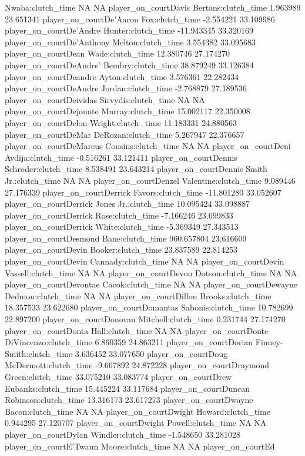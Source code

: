 \documentclass[
  landscape]{article}
\begin{document}
Nwaba:clutch\_time NA NA player\_on\_courtDavis Bertans:clutch\_time
1.963989 23.651341 player\_on\_courtDe'Aaron Fox:clutch\_time -2.554221
33.109986 player\_on\_courtDe'Andre Hunter:clutch\_time -11.943345
33.320169 player\_on\_courtDe'Anthony Melton:clutch\_time 3.554382
33.095683 player\_on\_courtDean Wade:clutch\_time 12.380746 27.174270
player\_on\_courtDeAndre' Bembry:clutch\_time 38.879249 33.126384
player\_on\_courtDeandre Ayton:clutch\_time 3.576361 22.282434
player\_on\_courtDeAndre Jordan:clutch\_time -2.768879 27.189536
player\_on\_courtDeividas Sirvydis:clutch\_time NA NA
player\_on\_courtDejounte Murray:clutch\_time 15.002117 22.350008
player\_on\_courtDelon Wright:clutch\_time 11.183331 24.880563
player\_on\_courtDeMar DeRozan:clutch\_time 5.267947 22.376657
player\_on\_courtDeMarcus Cousins:clutch\_time NA NA
player\_on\_courtDeni Avdija:clutch\_time -0.516261 33.121411
player\_on\_courtDennis Schroder:clutch\_time 8.538491 23.643214
player\_on\_courtDennis Smith Jr.:clutch\_time NA NA
player\_on\_courtDenzel Valentine:clutch\_time 9.089446 27.176339
player\_on\_courtDerrick Favors:clutch\_time -11.801280 33.052607
player\_on\_courtDerrick Jones Jr.:clutch\_time 10.095424 33.098887
player\_on\_courtDerrick Rose:clutch\_time -7.166246 23.699833
player\_on\_courtDerrick White:clutch\_time -5.369349 27.343513
player\_on\_courtDesmond Bane:clutch\_time 960.657804 23.616609
player\_on\_courtDevin Booker:clutch\_time 23.837589 22.814253
player\_on\_courtDevin Cannady:clutch\_time NA NA player\_on\_courtDevin
Vassell:clutch\_time NA NA player\_on\_courtDevon Dotson:clutch\_time NA
NA player\_on\_courtDevontae Cacok:clutch\_time NA NA
player\_on\_courtDewayne Dedmon:clutch\_time NA NA
player\_on\_courtDillon Brooks:clutch\_time 18.357533 23.622680
player\_on\_courtDomantas Sabonis:clutch\_time 10.782699 22.897200
player\_on\_courtDonovan Mitchell:clutch\_time 0.231744 27.174270
player\_on\_courtDonta Hall:clutch\_time NA NA player\_on\_courtDonte
DiVincenzo:clutch\_time 6.860359 24.863211 player\_on\_courtDorian
Finney-Smith:clutch\_time 3.636452 33.077650 player\_on\_courtDoug
McDermott:clutch\_time -9.667892 24.872228 player\_on\_courtDraymond
Green:clutch\_time 33.075210 33.083774 player\_on\_courtDrew
Eubanks:clutch\_time 15.445224 33.117684 player\_on\_courtDuncan
Robinson:clutch\_time 13.316173 23.617273 player\_on\_courtDwayne
Bacon:clutch\_time NA NA player\_on\_courtDwight Howard:clutch\_time
0.944295 27.120707 player\_on\_courtDwight Powell:clutch\_time NA NA
player\_on\_courtDylan Windler:clutch\_time -1.548650 33.281028
player\_on\_courtE'Twaun Moore:clutch\_time NA NA player\_on\_courtEd
\end{document}
